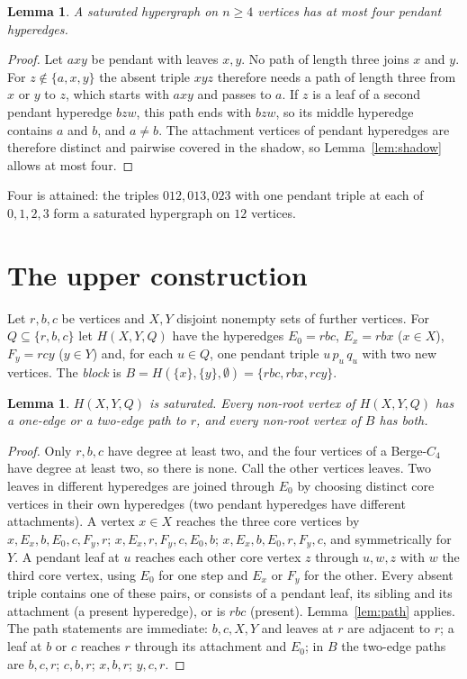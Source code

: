 \documentclass[11pt]{article}
\newtheorem{lemma}[theorem]{Lemma}
\theoremstyle{remark}
\begin{document}
\begin{lemma}\label{lem:pendant}
A saturated hypergraph on $n\ge4$ vertices has at most four pendant
hyperedges.
\end{lemma}

\begin{proof}
Let $axy$ be pendant with leaves $x,y$. No path of length three joins $x$
and $y$. For $z\notin\{a,x,y\}$ the absent triple $xyz$ therefore needs a
path of length three from $x$ or $y$ to $z$, which starts with $axy$ and
passes to $a$. If $z$ is a leaf of a second pendant hyperedge $bzw$, this
path ends with $bzw$, so its middle hyperedge contains $a$ and $b$, and
$a\ne b$. The attachment vertices of pendant hyperedges are therefore
distinct and pairwise covered in the shadow, so Lemma~\ref{lem:shadow}
allows at most four.
\end{proof}

Four is attained: the triples $012,013,023$ with one pendant triple at each
of $0,1,2,3$ form a saturated hypergraph on $12$ vertices.

\section{The upper construction}\label{sec:upper}

Let $r,b,c$ be vertices and $X,Y$ disjoint nonempty sets of further
vertices. For $Q\subseteq\{r,b,c\}$ let $H(X,Y,Q)$ have the hyperedges
$E_0=rbc$, $E_x=rbx$ ($x\in X$), $F_y=rcy$ ($y\in Y$) and, for each $u\in Q$,
one pendant triple $u\,p_u\,q_u$ with two new vertices. The \emph{block}
is $B=H(\{x\},\{y\},\emptyset)=\{rbc,rbx,rcy\}$.

\begin{lemma}\label{lem:base}
$H(X,Y,Q)$ is saturated. Every non-root vertex of $H(X,Y,Q)$ has a
one-edge or a two-edge path to $r$, and every non-root vertex of $B$ has
both.
\end{lemma}

\begin{proof}
Only $r,b,c$ have degree at least two, and the four vertices of a
Berge-$C_4$ have degree at least two, so there is none. Call the other
vertices leaves. Two leaves in different hyperedges are joined through
$E_0$ by choosing distinct core vertices in their own hyperedges (two
pendant hyperedges have different attachments). A vertex $x\in X$ reaches
the three core vertices by $x,E_x,b,E_0,c,F_y,r$; $x,E_x,r,F_y,c,E_0,b$;
$x,E_x,b,E_0,r,F_y,c$, and symmetrically for $Y$. A pendant leaf at $u$
reaches each other core vertex $z$ through $u,w,z$ with $w$ the third core
vertex, using $E_0$ for one step and $E_x$ or $F_y$ for the other. Every
absent triple contains one of these pairs, or consists of a pendant leaf,
its sibling and its attachment (a present hyperedge), or is $rbc$ (present).
Lemma~\ref{lem:path} applies. The path statements are immediate: $b,c,X,Y$
and leaves at $r$ are adjacent to $r$; a leaf at $b$ or $c$ reaches $r$
through its attachment and $E_0$; in $B$ the two-edge paths are
$b,c,r$; $c,b,r$; $x,b,r$; $y,c,r$.
\end{proof}
\end{document}
